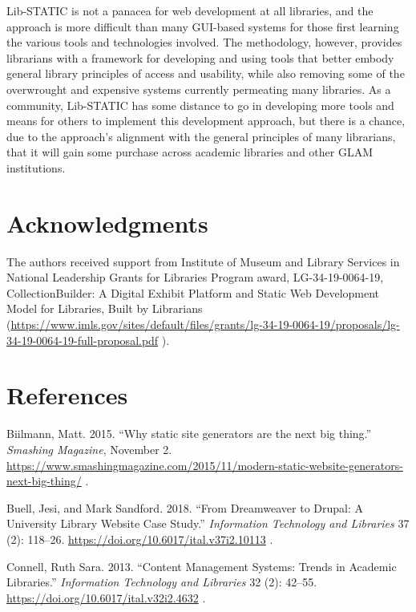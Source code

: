 \documentclass{book}
\begin{document}
Lib-STATIC is not a panacea for web development at all libraries, and the
approach is more difficult than many GUI-based systems for those first
learning the various tools and technologies involved. The methodology,
however, provides librarians with a framework for developing and using tools
that better embody general library principles of access and usability, while
also removing some of the overwrought and expensive systems currently
permeating many libraries. As a community, Lib-STATIC has some distance to go
in developing more tools and means for others to implement this development
approach, but there is a chance, due to the approach's alignment with the
general principles of many librarians, that it will gain some purchase across
academic libraries and other GLAM institutions.

\hypertarget{acknowledgments}{%
\chapter{Acknowledgments}\label{acknowledgments}}

The authors received support from Institute of Museum and Library Services in
National Leadership Grants for Libraries Program award, LG-34-19-0064-19,
CollectionBuilder: A Digital Exhibit Platform and Static Web Development Model
for Libraries, Built by Librarians
(\url{https://www.imls.gov/sites/default/files/grants/lg-34-19-0064-19/proposals/lg-34-19-0064-19-full-proposal.pdf}
).

\hypertarget{section}{%
\chapter{}\label{section}}

\hypertarget{references}{%
\chapter{References}\label{references}}

Biilmann, Matt. 2015. ``Why static site generators are the next big thing.''
\emph{Smashing Magazine}, November 2.
\url{https://www.smashingmagazine.com/2015/11/modern-static-website-generators-next-big-thing/}
.

Buell, Jesi, and Mark Sandford. 2018. ``From Dreamweaver to Drupal: A
University Library Website Case Study.'' \emph{Information Technology and
Libraries} 37 (2): 118--26. \url{https://doi.org/10.6017/ital.v37i2.10113} .

Connell, Ruth Sara. 2013. ``Content Management Systems: Trends in Academic
Libraries.'' \emph{Information Technology and Libraries} 32 (2): 42--55.
\url{https://doi.org/10.6017/ital.v32i2.4632} .
\end{document}
